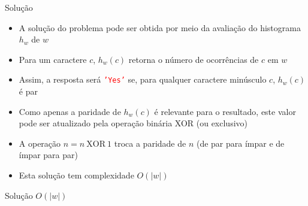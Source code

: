 \begin{frame}[fragile]{Solução}

    \begin{itemize}
        \item A solução do problema pode ser obtida por meio da avaliação do histograma $h_w$ de $w$

        \item Para um caractere $c$, $h_w(c)$ retorna o número de ocorrências de $c$ em $w$

        \item Assim, a resposta será \texttt{\textcolor{red}{'Yes'}} se, para qualquer caractere
            minúsculo $c$, $h_w(c)$ é par

        \item Como apenas a paridade de $h_w(c)$ é relevante para o resultado, este valor pode
            ser atualizado pela operação binária XOR (ou exclusivo)

        \item A operação $n = n\ \mbox{XOR}\ 1$ troca a paridade de $n$ (de par para ímpar e de
            ímpar para par)

        \item Esta solução tem complexidade $O(|w|)$
    \end{itemize}

\end{frame}

\begin{frame}[fragile]{Solução $O(|w|)$}
\end{frame}
